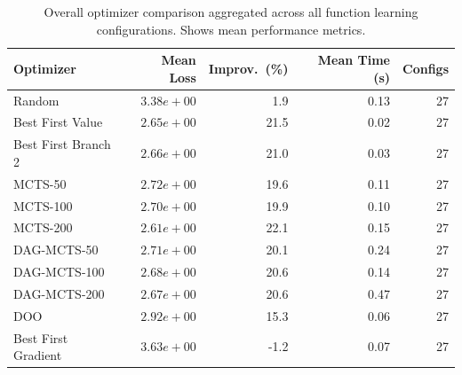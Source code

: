 \begin{table}[H]
\centering
\caption{Overall optimizer comparison aggregated across all function learning configurations. Shows mean performance metrics.}
\label{tab:funclearn-optimizer-aggregate}
\begin{tabular}{lrrrr}
\toprule
Optimizer & Mean Loss & Improv.~(\%) & Mean Time (s) & Configs \\
\midrule
Random & $3.38e+00$ & 1.9 & 0.13 & 27 \\
\hline
Best First Value & $2.65e+00$ & 21.5 & 0.02 & 27 \\
\hline
Best First Branch 2 & $2.66e+00$ & 21.0 & 0.03 & 27 \\
\hline
MCTS-50 & $2.72e+00$ & 19.6 & 0.11 & 27 \\
\hline
MCTS-100 & $2.70e+00$ & 19.9 & 0.10 & 27 \\
\hline
MCTS-200 & \textbf{$2.61e+00$} & 22.1 & 0.15 & 27 \\
\hline
DAG-MCTS-50 & $2.71e+00$ & 20.1 & 0.24 & 27 \\
\hline
DAG-MCTS-100 & $2.68e+00$ & 20.6 & 0.14 & 27 \\
\hline
DAG-MCTS-200 & $2.67e+00$ & 20.6 & 0.47 & 27 \\
\hline
DOO & $2.92e+00$ & 15.3 & 0.06 & 27 \\
\hline
Best First Gradient & $3.63e+00$ & -1.2 & 0.07 & 27 \\
\bottomrule
\end{tabular}
\end{table}


\begin{landscape}
\begin{table}[H]
\centering
\footnotesize
\caption{Performance comparison by target function type. Shows mean final loss aggregated over configurations for each function type.}
\label{tab:funclearn-function-type}
\end{table}
\end{landscape}

